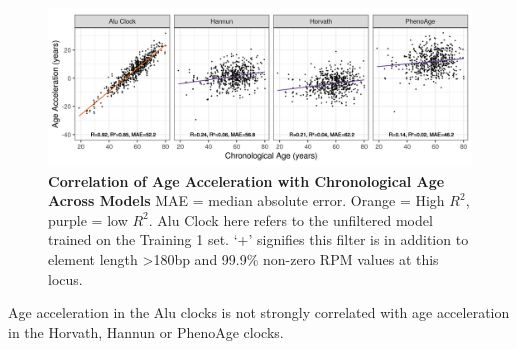 \documentclass[
]{book}
\begin{document}
\begin{figure}

{\centering \includegraphics[width=0.9\linewidth]{./figs/age_vs_age_accel_alu_vs_other} 

}

\caption{\textbf{Correlation of Age Acceleration with Chronological Age Across Models} MAE = median absolute error. Orange = High \(R^2\), purple = low \(R^2\). Alu Clock here refers to the unfiltered model trained on the Training 1 set. `+' signifies this filter is in addition to element length \textgreater180bp and 99.9\% non-zero RPM values at this locus.}\label{fig:ageVsAgeAccelAluVsOther}
\end{figure}



Age acceleration in the Alu clocks is not strongly correlated with age acceleration in the Horvath, Hannun or PhenoAge clocks.
\end{document}
